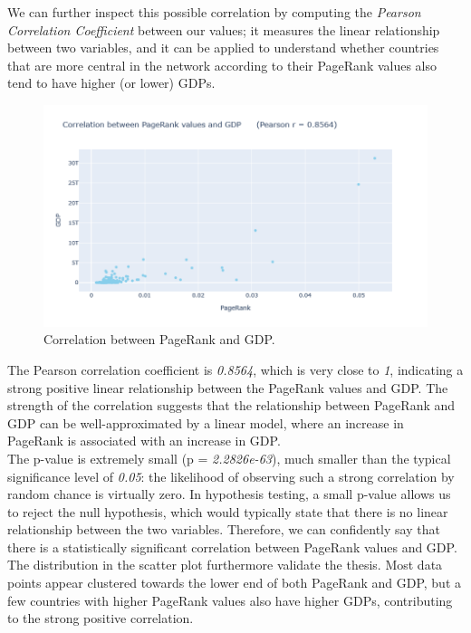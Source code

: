 \documentclass[12pt, a4paper]{article}
\begin{document}
We can further inspect this possible correlation by computing the \textit{Pearson Correlation Coefficient} between our values; it measures the linear relationship between two variables, and it can be applied to understand whether countries that are more central in the network according to their PageRank values also tend to have higher (or lower) GDPs.

\begin{figure}[!ht]
\centering
\includegraphics[width=.8\textwidth]{figures/question3/figure_8.png}
\vspace{1em}
\captionsetup{font=scriptsize,labelfont=bf}
\caption{Correlation between PageRank and GDP.}
\label{fig:figure8}
\end{figure}

The Pearson correlation coefficient is \textit{0.8564}, which is very close to \textit{1}, indicating a strong positive linear relationship between the PageRank values and GDP. The strength of the correlation suggests that the relationship between PageRank and GDP can be well-approximated by a linear model, where an increase in PageRank is associated with an increase in GDP.\\

The p-value is extremely small (p = \textit{2.2826e-63}), much smaller than the typical significance level of \textit{0.05}: the likelihood of observing such a strong correlation by random chance is virtually zero. In hypothesis testing, a small p-value allows us to reject the null hypothesis, which would typically state that there is no linear relationship between the two variables. Therefore, we can confidently say that there is a statistically significant correlation between PageRank values and GDP.\\

The distribution in the scatter plot furthermore validate the thesis. Most data points appear clustered towards the lower end of both PageRank and GDP, but a few countries with higher PageRank values also have higher GDPs, contributing to the strong positive correlation.
\end{document}

